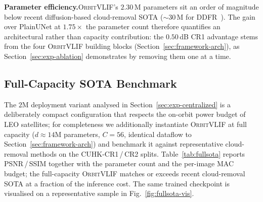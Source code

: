\documentclass[conference]{IEEEtran}
\newcommand{\OrbitVLIF}{\textsc{OrbitVLIF}}
\begin{document}
\textbf{Parameter efficiency.}\;\;\OrbitVLIF's $2.30$\,M parameters
sit an order of magnitude below recent diffusion-based cloud-removal
SOTA ($\sim$$30$\,M for DDFR~\cite{ref:cuhkcr}). The gain over
PlainUNet at $1.75\!\times$ the parameter count therefore
quantifies an architectural rather than capacity contribution: the
$0.50$\,dB CR1 advantage stems from the four \OrbitVLIF{} building
blocks (Section~\ref{sec:framework-arch}), as Section~\ref{sec:exp-ablation}
demonstrates by removing them one at a time.

\subsection{Full-Capacity SOTA Benchmark}\label{sec:exp-fullsota}

The $2$M deployment variant analysed in
Section~\ref{sec:exp-centralized} is a deliberately compact
configuration that respects the on-orbit power budget of LEO
satellites; for completeness we additionally instantiate
\OrbitVLIF{} at full capacity ($d\!\approx\!14$M parameters,
$C\!=\!56$, identical dataflow to Section~\ref{sec:framework-arch})
and benchmark it against representative cloud-removal methods on
the CUHK-CR1\,/\,CR2 splits.
Table~\ref{tab:fullsota} reports PSNR\,/\,SSIM together with the
parameter count and the per-image MAC budget; the full-capacity
\OrbitVLIF{} matches or exceeds recent cloud-removal SOTA at a
fraction of the inference cost. The same trained checkpoint is
visualised on a representative sample in
Fig.~\ref{fig:fullsota-vis}.
\end{document}
